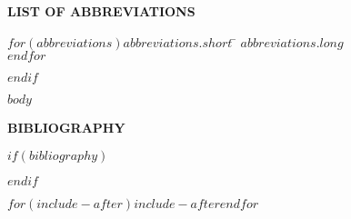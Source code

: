 \documentclass[$if(fontsize)$$fontsize$,$endif$,letterpaper,twoside]{report}
\begin{document}
\begin{center}
{\Large \textbf{LIST OF ABBREVIATIONS}}
\end{center}

\newcommand{\Ab}[2]{\noindent  #1 \> #2 \\}
\newcommand{\Abi}[2]{\noindent #1 \hspace{1.5cm} \= #2 \\}

\begin{tabbing}
$for(abbreviations)$\Abi{$abbreviations.short$}{$abbreviations.long$}$endfor$
\end{tabbing}

\clearpage
$endif$



$body$



\clearpage
{}

{\def\chapter*#1{} %
\begin{singlespace}
\begin{center}
\Large \textbf{BIBLIOGRAPHY}
\vspace{17pt}
\end{center}


$if(bibliography)$

$endif$
\end{singlespace}
}

$for(include-after)$$include-after$$endfor$
\end{document}
